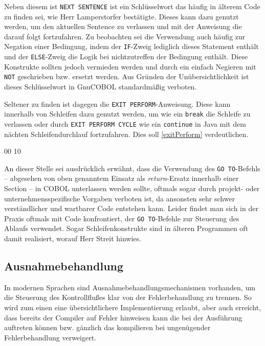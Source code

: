 Neben diesem ist \texttt{NEXT SENTENCE} ist ein Schlüsselwort das häufig in älterem Code zu finden sei, wie Herr Lamperstorfer bestätigte. Dieses kann dazu genutzt werden, um den aktuellen Sentence zu verlassen und mit der Anweisung die darauf folgt fortzufahren. Zu beobachten sei die Verwendung auch häufig zur Negation einer Bedingung, indem der \texttt{IF}-Zweig lediglich dieses Statement enthält und der \texttt{ELSE}-Zweig die Logik bei nichtzutreffen der Bedingung enthält. Diese Konstrukte sollten jedoch vermieden werden und durch ein einfach Negieren mit \texttt{NOT} geschrieben bzw. ersetzt werden. Aus Gründen der Unübersichtlichkeit ist dieses Schlüsselwort in GnuCOBOL standardmäßig verboten. 

Seltener zu finden ist dagegen die \texttt{EXIT PERFORM}-Anweisung. Diese kann innerhalb von Schleifen dazu genutzt werden, um wie ein \texttt{break} die Schleife zu verlassen oder durch \texttt{EXIT PERFORM CYCLE} wie ein \texttt{continue} in Java mit dem nächten Schleifendurchlauf fortzufahren. Dies soll \autoref{exitPerform} verdeutlichen.

\sepCodeAndOutputCheck
\begin{shellwindow}
00
10
\end{shellwindow}

An dieser Stelle sei ausdrücklich erwähnt, dass die Verwendung des \texttt{GO TO}-Befehls -- abgesehen von oben genanntem Einsatz als \textit{return}-Ersatz innerhalb einer Section -- in COBOL unterlassen werden sollte, oftmals sogar durch projekt- oder unternehmensspezifische Vorgaben verboten ist, da ansonsten sehr schwer verständlicher und wartbarer Code entstehen kann. Leider findet man sich in der Praxis oftmals mit Code konfrontiert, der \texttt{GO TO}-Befehle zur Steuerung des Ablaufs verwendet. Sogar Schleifenkonstrukte sind in älteren Programmen oft damit realisiert, worauf Herr Streit hinwies.

\subsection{Ausnahmebehandlung}

In modernen Sprachen sind Ausnahmebehandlungsmechanismen vorhanden, um die Steuerung des Kontrollflußes klar von der Fehlerbehandlung zu trennen. So wird zum einen eine übersichtlichere Implementierung erlaubt, aber auch erreicht, dass bereits der Compiler auf Fehler hinweisen kann die bei der Ausführung auftreten können bzw. gänzlich das kompilieren bei ungenügender Fehlerbehandlung verweigert.

